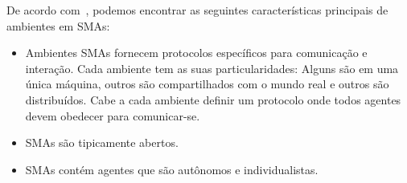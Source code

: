 De acordo com~\cite{sarmento11}, podemos encontrar as seguintes características principais de ambientes em SMAs:
\begin{itemize}
	\item Ambientes SMAs fornecem protocolos específicos para comunicação e interação. Cada ambiente tem as suas particularidades: Alguns são em uma única máquina, outros são compartilhados com o mundo real e outros são distribuídos. Cabe a cada ambiente definir um protocolo onde todos agentes devem obedecer para comunicar-se.
	\item SMAs são tipicamente abertos.
	\item SMAs contém agentes que são autônomos e individualistas.
\end{itemize}



























